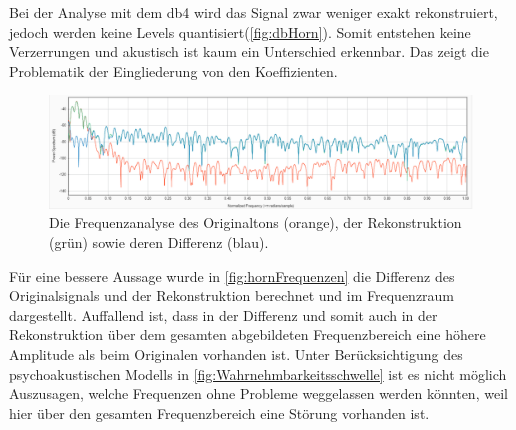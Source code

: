 \begin{refsection}
\begin{figure}
	\label{fig:hornOnlyQuant}
\end{figure}
Bei der Analyse mit dem db4 wird das Signal zwar weniger exakt rekonstruiert, jedoch werden keine Levels quantisiert(\autoref{fig:dbHorn}).
Somit entstehen keine Verzerrungen und akustisch ist kaum ein Unterschied erkennbar.
Das zeigt die Problematik der Eingliederung von den Koeffizienten.
\begin{figure}
	\centering
	\includegraphics[width=\linewidth]{papers/compress/Bilder/sigAnalysisFreq.pdf}
	\caption{Die Frequenzanalyse des Originaltons (orange), der Rekonstruktion (grün) sowie deren Differenz (blau).}
	\label{fig:hornFrequenzen}
\end{figure}
Für eine bessere Aussage wurde in \autoref{fig:hornFrequenzen} die Differenz des Originalsignals und der Rekonstruktion berechnet und im Frequenzraum dargestellt.
Auffallend ist, dass in der Differenz und somit auch in der Rekonstruktion über dem gesamten abgebildeten Frequenzbereich eine höhere Amplitude als beim Originalen vorhanden ist.
Unter Berücksichtigung des psychoakustischen Modells in \autoref{fig:Wahrnehmbarkeitsschwelle} ist es nicht möglich Auszusagen, welche Frequenzen ohne Probleme weggelassen werden könnten, weil hier über den gesamten Frequenzbereich eine Störung vorhanden ist.


\end{refsection}
